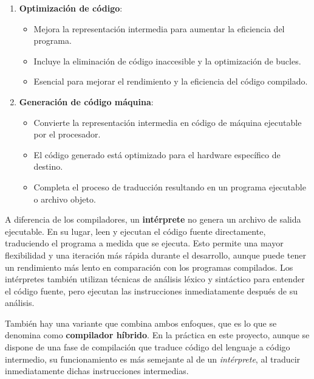 \begin{enumerate}
    \item \textbf{Optimización de código}:
        \begin{itemize}
            \item Mejora la representación intermedia para aumentar la eficiencia del programa.
            \item Incluye la eliminación de código inaccesible y la optimización de bucles.
            \item Esencial para mejorar el rendimiento y la eficiencia del código compilado.
        \end{itemize}

    \item \textbf{Generación de código máquina}:
        \begin{itemize}
            \item Convierte la representación intermedia en código de máquina ejecutable por el procesador.
            \item El código generado está optimizado para el hardware específico de destino.
            \item Completa el proceso de traducción resultando en un programa ejecutable o archivo objeto.
        \end{itemize}
\end{enumerate}


A diferencia de los compiladores, un \textbf{intérprete} no genera un archivo de salida ejecutable. En su lugar, leen y ejecutan el código fuente directamente, traduciendo el programa a medida que se ejecuta. Esto permite una mayor flexibilidad y una iteración más rápida durante el desarrollo, aunque puede tener un rendimiento más lento en comparación con los programas compilados. Los intérpretes también utilizan técnicas de análisis léxico y sintáctico para entender el código fuente, pero ejecutan las instrucciones inmediatamente después de su análisis.

También hay una variante que combina ambos enfoques, que es lo que se denomina como \textbf{compilador híbrido}. En la práctica en este proyecto, aunque se dispone de una fase de compilación que traduce código del lenguaje a código intermedio, su funcionamiento es más semejante al de un \textit{intérprete}, al traducir inmediatamente dichas instrucciones intermedias.